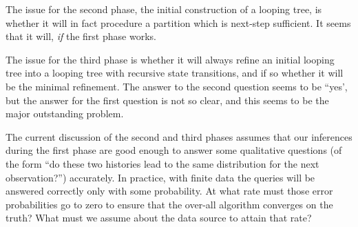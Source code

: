 \documentclass[../new-procedure.tex]{subfiles}
\begin{document}
The issue for the second phase, the initial construction of a looping tree, is
whether it will in fact procedure a partition which is next-step sufficient.
It seems that it will, {\em if} the first phase works.

The issue for the third phase is whether it will always refine an initial
looping tree into a looping tree with recursive state transitions, and if so
whether it will be the minimal refinement.  The answer to the second question
seems to be ``yes', but the answer for the first question is not so clear, and
this seems to be the major outstanding problem.

The current discussion of the second and third phases assumes that our
inferences during the first phase are good enough to answer some qualitative
questions (of the form ``do these two histories lead to the same distribution
for the next observation?'') accurately.  In practice, with finite data the
queries will be answered correctly only with some probability.  At what rate
must those error probabilities go to zero to ensure that the over-all algorithm
converges on the truth?  What must we assume about the data source to attain
that rate?
\end{document}
